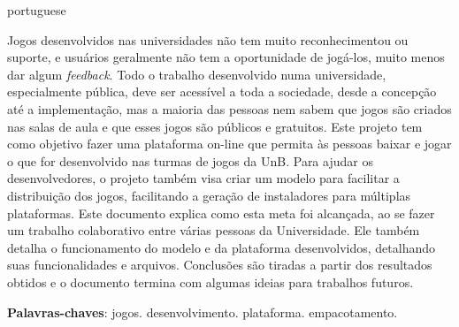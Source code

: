 \begin{resumo}[Resumo]
 \begin{otherlanguage*}{portuguese}

Jogos desenvolvidos nas universidades não tem muito reconhecimentou ou suporte, e usuários geralmente não tem a oportunidade de jogá-los, muito menos dar algum \textit{feedback}. Todo o trabalho desenvolvido numa universidade, especialmente pública, deve ser acessível a toda a sociedade, desde a concepção até a implementação, mas a maioria das pessoas nem sabem que jogos são criados nas salas de aula e que esses jogos são públicos e gratuitos. Este projeto tem como objetivo fazer uma plataforma on-line que permita às pessoas baixar e jogar o que for desenvolvido nas turmas de jogos da UnB. Para ajudar os desenvolvedores, o projeto também visa criar um modelo para facilitar a distribuição dos jogos, facilitando a geração de instaladores para múltiplas plataformas. Este documento explica como esta meta foi alcançada, ao se fazer um trabalho colaborativo entre várias pessoas da Universidade. Ele também detalha o funcionamento do modelo e da plataforma desenvolvidos, detalhando suas funcionalidades e arquivos. Conclusões são tiradas a partir dos resultados obtidos e o documento termina com algumas ideias para trabalhos futuros.

 \vspace{\onelineskip}

 \noindent
 \textbf{Palavras-chaves}: jogos. desenvolvimento. plataforma. empacotamento.
 \end{otherlanguage*}
\end{resumo}
